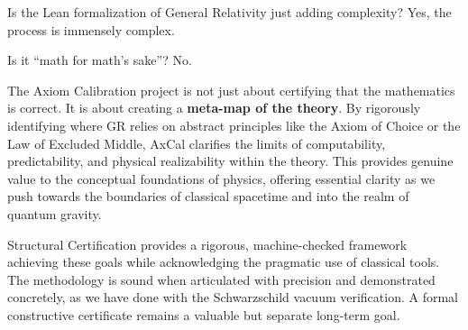 \documentclass[11pt]{article}
\theoremstyle{definition}
\theoremstyle{remark}
\begin{document}
Is the Lean formalization of General Relativity just adding complexity? Yes, the process is immensely complex.

Is it ``math for math's sake''? No.

The Axiom Calibration project is not just about certifying that the mathematics is correct. It is about creating a \textbf{meta-map of the theory}. By rigorously identifying where GR relies on abstract principles like the Axiom of Choice or the Law of Excluded Middle, AxCal clarifies the limits of computability, predictability, and physical realizability within the theory. This provides genuine value to the conceptual foundations of physics, offering essential clarity as we push towards the boundaries of classical spacetime and into the realm of quantum gravity.

Structural Certification provides a rigorous, machine-checked framework achieving these goals while acknowledging the pragmatic use of classical tools. The methodology is sound when articulated with precision and demonstrated concretely, as we have done with the Schwarzschild vacuum verification. A formal constructive certificate remains a valuable but separate long-term goal.
\end{document}
